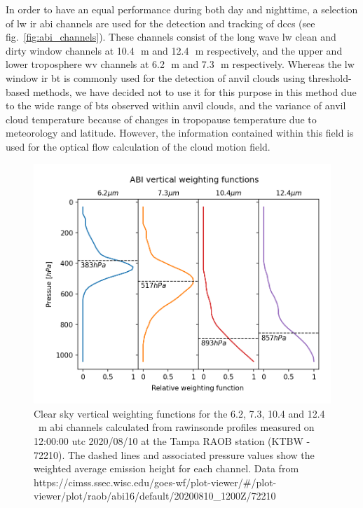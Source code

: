 In order to have an equal performance during both day and nighttime, a selection of \acrshort{lw} \acrshort{ir} \acrshort{abi} channels are used for the detection and tracking of \acrshort{dcc}s (see fig.~\ref{fig:abi_channels}). 
These channels consist of the long wave \acrshort{lw} clean and dirty window channels at 10.4\,\unit{\mu m} and 12.4\,\unit{\mu m} respectively, and the upper and lower troposphere \acrshort{wv} channels at 6.2\,\unit{\mu m} and 7.3\,\unit{\mu m} respectively.
Whereas the \acrshort{lw} window \acrshort{ir} \acrshort{bt} is commonly used for the detection of anvil clouds using threshold-based methods, we have decided not to use it for this purpose in this method due to the wide range of \acrshort{bt}s observed within anvil clouds, and the variance of anvil cloud temperature because of changes in tropopause temperature due to meteorology and latitude.
However, the information contained within this field is used for the optical flow calculation of the cloud motion field.

\begin{figure}[t]
    \includegraphics[width=\textwidth]{figures/chapter1_04.png}
    \caption[
    Clear sky vertical weighting functions for the 6.2, 7.3, 10.4 and 12.4\,\unit{\mu m} \acrshort{abi} channels
    ]{
    Clear sky vertical weighting functions for the 6.2, 7.3, 10.4 and 12.4\,\unit{\mu m} \acrshort{abi} channels calculated from rawinsonde profiles measured on 12:00:00 \acrshort{utc} 2020/08/10 at the Tampa RAOB station (KTBW - 72210). The dashed lines and associated pressure values show the weighted average emission height for each channel. Data from {https://cimss.ssec.wisc.edu/goes-wf/plot-viewer/\#/plot-viewer/plot/raob/abi16/default/20200810\_1200Z/72210}
    }
    \label{fig:abi_vertical_weighting}
\end{figure}

